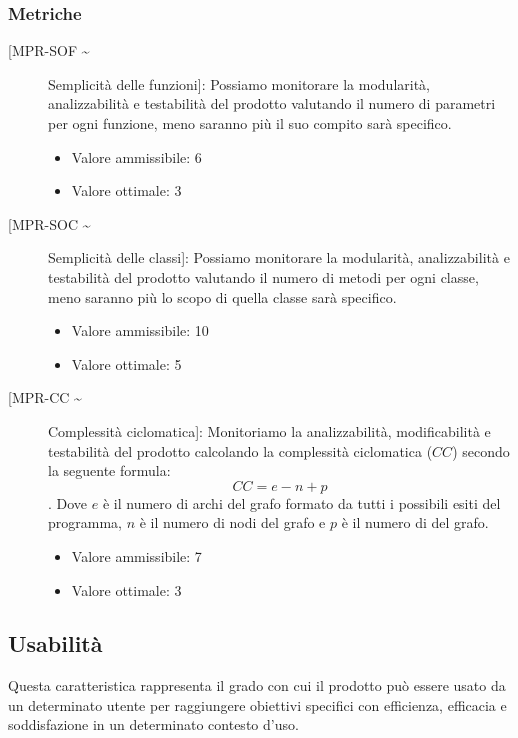 \documentclass[../piano-di-qualifica.tex]{subfiles}
\begin{document}
\subsubsection{Metriche}%
\label{subs:metriche_manutenibilita}
  \begin{description}
    \item [[MPR-SOF \textasciitilde] Semplicità delle funzioni]: Possiamo monitorare la modularità, analizzabilità e testabilità del prodotto valutando il numero di parametri per ogni funzione, meno saranno più il suo compito sarà specifico.
      \begin{itemize}   \item Valore ammissibile: \leq{}  6 \item Valore ottimale: \leq{}  3 \end{itemize}
    \item [[MPR-SOC \textasciitilde] Semplicità delle classi]: Possiamo monitorare la modularità, analizzabilità e testabilità del prodotto valutando il numero di metodi per ogni classe, meno saranno più lo scopo di quella classe sarà specifico.
      \begin{itemize} \item Valore ammissibile: \leq{}  10 \item Valore ottimale: \leq{}  5 \end{itemize}
    \item [[MPR-CC \textasciitilde] Complessità ciclomatica]: Monitoriamo la analizzabilità, modificabilità e testabilità del prodotto calcolando la complessità ciclomatica (\(CC\)) secondo la seguente formula: \begin{equation} CC = e - n + p \end{equation}. Dove \(e\) è il numero di archi del grafo formato da tutti i possibili esiti del programma, \(n\) è il numero di nodi del grafo e \(p\) è il numero di  del grafo.
      \begin{itemize} \item Valore ammissibile: \leq{}  7 \item Valore ottimale: \leq{}  3 \end{itemize}
  \end{description}


\subsection{Usabilità}%
\label{sub:usabilita}
Questa caratteristica rappresenta il grado con cui il prodotto può essere usato da un determinato utente per raggiungere obiettivi specifici con efficienza, efficacia e soddisfazione in un determinato contesto d'uso.
\end{document}
